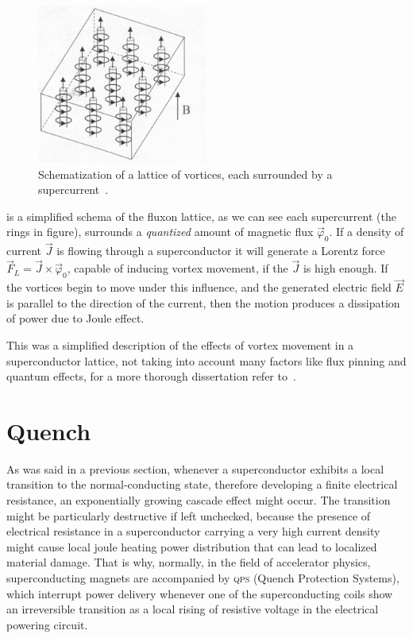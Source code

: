 \begin{figure}[!ht]
	\centering
	\includegraphics[width=0.5\textwidth]{./img/Abrikosov_vortices.png}
	\caption{Schematization of a lattice of vortices, each surrounded by a
		supercurrent~\cite{huebener2019}.}
	\label{fig:abrikosov-lattice}
\end{figure}

 is a simplified schema of the fluxon lattice, as we can see each
supercurrent (the rings in figure), surrounds a \emph{quantized} amount of magnetic flux
$\vec{\varphi}_0$. If a density of current $\vec{J}$ is flowing through a superconductor it will
generate a Lorentz force $\vec{F}_L = \vec{J} \times \vec{\varphi}_0$, capable of inducing vortex
movement, if the $\vec{J}$ is high enough. If the vortices begin to move under this influence, and
the generated electric field $\vec{E}$ is parallel to the direction of the current, then the motion
produces a dissipation of power due to Joule effect.

This was a simplified description of the effects of vortex movement in a superconductor lattice, not
taking into account many factors like flux pinning and quantum effects, for a more thorough
dissertation refer to~\cite{huebener2019}.

\section{Quench}
As was said in a previous section, whenever a superconductor exhibits a local transition to the
normal-conducting state, therefore developing a finite electrical resistance, an exponentially
growing cascade effect might occur. The transition might be particularly destructive if left
unchecked, because the presence of electrical resistance in a superconductor carrying a very high
current density might cause local joule heating power distribution that can lead to localized
material damage. That is why, normally, in the field of accelerator physics, superconducting magnets
are accompanied by \textsc{qps} (Quench Protection Systems), which interrupt power delivery whenever
one of the superconducting coils show an irreversible transition as a local rising of resistive
voltage in the electrical powering circuit.
